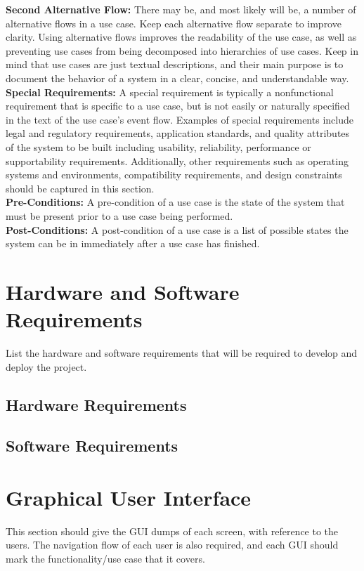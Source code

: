 \documentclass{FastFyp}
\begin{document}
\textbf{Second Alternative Flow:} There may be, and most likely will be, a number of alternative flows in a use case. Keep each alternative flow separate to improve clarity. Using alternative flows improves the readability of the use case, as well as preventing use cases from being decomposed into hierarchies of use cases. Keep in mind that use cases are just textual descriptions, and their main purpose is to document the behavior of a system in a clear, concise, and understandable way.\\
\textbf{Special Requirements:} A special requirement is typically a nonfunctional requirement that is specific to a use case, but is not easily or naturally specified in the text of the use case’s event flow. Examples of special requirements include legal and regulatory requirements, application standards, and quality attributes of the system to be built including usability, reliability, performance or supportability requirements. Additionally, other requirements such as operating systems and environments, compatibility requirements, and design constraints should be captured in this section.\\
\textbf{Pre-Conditions:} A pre-condition of a use case is the state of the system that must be present prior to a use case being performed.\\
\textbf{Post-Conditions:} A post-condition of a use case is a list of possible states the system can be in immediately after a use case has finished.
\section{Hardware and Software Requirements}
List the hardware and software requirements that will be required to develop and deploy the project.
\subsection{Hardware Requirements}
\subsection{Software Requirements}
\section{Graphical User Interface}
This section should give the GUI dumps of each screen, with reference to the users. The navigation flow of each user is also required, and each GUI should mark the functionality/use case that it covers.
\end{document}
